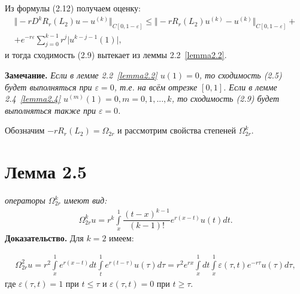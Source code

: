 Из формулы (2.12) получаем оценку:
\begin{equation}
\begin{array}{c}
\nonumber

\Vert -rD^kR_r(L_2)u - u^{(k)} \Vert_{C[0,1-\varepsilon]} \leq \Vert -rR_r(L_2)u^{(k)} - u^{(k)} \Vert_{C[0,1-\varepsilon]} + \\ + e^{-r\varepsilon}\sum\limits_{j=0}^{k-1} r^j\vert u^{k-j-1}(1)\vert ,

\end{array}
\end{equation}
и тогда сходимость (2.9) вытекает из леммы 2.2~\eqref{lemma2.2}.

\textbf{Замечание.} \textit{Если в лемме 2.2~\eqref{lemma2.2} $ u(1) = 0 $, то сходимость (2.5) будет выполняться при $ \varepsilon = 0 $, т.е. на всём отрезке $ [0,1] $. Если в лемме 2.4~\eqref{lemma2.4} $ u^{(m)}(1) = 0, m = 0,1,...,k $, то сходимость (2.9) будет выполняться также при $ \varepsilon = 0 $.}

Обозначим $ -rR_r(L_2) = \Omega_{2r} $ и рассмотрим свойства степеней $ \Omega_{2r}^k $.

\section{Лемма 2.5}
\label{lemma2.5}
\textit{операторы $ \Omega_{2r}^k $ имеют вид:}
\begin{equation}
\begin{array}{c}

\Omega_{2r}^ku = r^k\int\limits_x^1 \dfrac{(t-x)^{k-1}}{(k-1)!}e^{r(x-t)}u(t)dt.

\end{array}
\end{equation}
\textbf{Доказательство.} Для $ k = 2 $ имеем:

\begin{equation}
\begin{array}{c}
\nonumber

\Omega_{2r}^2u = r^2\int\limits_x^1 e^{r(x-t)}dt\int\limits_t^1 e^{r(t-\tau)}u(\tau)d\tau = r^2e^{rx} \int\limits_x^1 dt \int\limits_x^1 \varepsilon (\tau ,t)e^{-r\tau}u(\tau)d\tau ,

\end{array}
\end{equation}
где $ \varepsilon (\tau ,t) = 1 $ при $ t \leq \tau $ и $ \varepsilon (\tau ,t) = 0 $ при $ t \geq \tau $.

